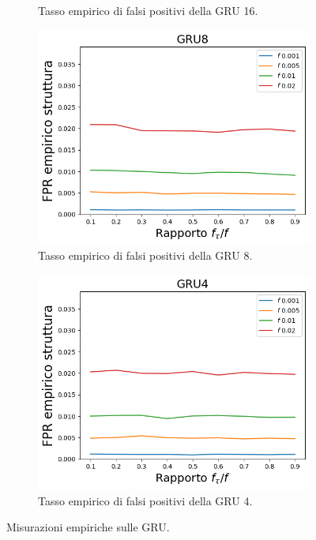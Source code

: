 \documentclass[../../main.tex]{subfiles}
\begin{document}
\begin{figure}[H]
\begin{subfigure}[b]{0.32\textwidth}
            \caption{Tasso empirico di falsi positivi della GRU 16.}
            \label{fig:LBFFPR_GRU16}
        \end{subfigure}
        \begin{subfigure}[b]{0.32\textwidth}
            \centering
            \includegraphics[width = \textwidth]{immagini/7/LBF/GRU8_FPR.png}
            \caption{Tasso empirico di falsi positivi della GRU 8.}
            \label{fig:LBFFPR_GRU8}
        \end{subfigure}
        \begin{subfigure}[b]{0.32\textwidth}
            \centering
            \includegraphics[width = \textwidth]{immagini/7/LBF/GRU4_FPR.png}
            \caption{Tasso empirico di falsi positivi della GRU 4.}
            \label{fig:LBFFPR_GRU4}
        \end{subfigure}
        \caption{Misurazioni empiriche sulle GRU.}
        \label{fig:GRUEmpiricoLBF}
    \end{figure}
\end{document}
